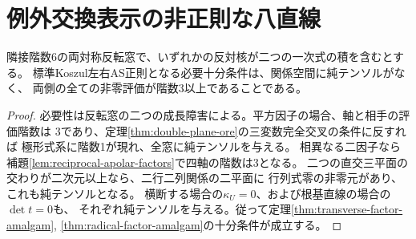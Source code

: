 \section{例外交換表示の非正則な八直線}
\label{sec:exceptional-exchange-sheets}
\begin{lemma}\label{lem:bisymmetric-reducible-quick-test}
隣接階数6の両対称反転窓で、いずれかの反対核が二つの一次式の積を含むとする。
標準Koszul左右AS正則となる必要十分条件は、関係空間に純テンソルがなく、
両側の全ての非零評価が階数3以上であることである。
\end{lemma}
\begin{proof}
必要性は反転窓の二つの成長障害による。平方因子の場合、軸と相手の評価階数は
3であり、定理\ref{thm:double-plane-ore}の三変数完全交叉の条件に反すれば
極形式系に階数1が現れ、全窓に純テンソルを与える。
相異なる二因子なら補題\ref{lem:reciprocal-apolar-factors}で四軸の階数は3となる。
二つの直交三平面の交わりが二次元以上なら、二行二列関係の二平面に
行列式零の非零元があり、これも純テンソルとなる。
横断する場合の$\kappa_U=0$、および根基直線の場合の$\det t=0$も、
それぞれ純テンソルを与える。従って定理\ref{thm:transverse-factor-amalgam},
\ref{thm:radical-factor-amalgam}の十分条件が成立する。
\end{proof}

